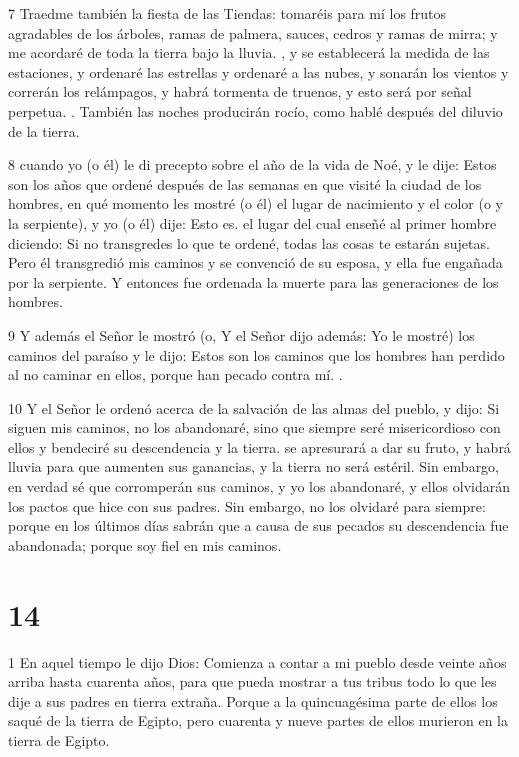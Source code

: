 \par 7 Traedme también la fiesta de las Tiendas: tomaréis para mí los frutos agradables de los árboles, ramas de palmera, sauces, cedros y ramas de mirra; y me acordaré de toda la tierra bajo la lluvia. , y se establecerá la medida de las estaciones, y ordenaré las estrellas y ordenaré a las nubes, y sonarán los vientos y correrán los relámpagos, y habrá tormenta de truenos, y esto será por señal perpetua. . También las noches producirán rocío, como hablé después del diluvio de la tierra.

\par 8 cuando yo (o él) le di precepto sobre el año de la vida de Noé, y le dije: Estos son los años que ordené después de las semanas en que visité la ciudad de los hombres, en qué momento les mostré (o él) el lugar de nacimiento y el color (o y la serpiente), y yo (o él) dije: Esto es. el lugar del cual enseñé al primer hombre diciendo: Si no transgredes lo que te ordené, todas las cosas te estarán sujetas. Pero él transgredió mis caminos y se convenció de su esposa, y ella fue engañada por la serpiente. Y entonces fue ordenada la muerte para las generaciones de los hombres.

\par 9 Y además el Señor le mostró (o, Y el Señor dijo además: Yo le mostré) los caminos del paraíso y le dijo: Estos son los caminos que los hombres han perdido al no caminar en ellos, porque han pecado contra mí. .

\par 10 Y el Señor le ordenó acerca de la salvación de las almas del pueblo, y dijo: Si siguen mis caminos, no los abandonaré, sino que siempre seré misericordioso con ellos y bendeciré su descendencia y la tierra. se apresurará a dar su fruto, y habrá lluvia para que aumenten sus ganancias, y la tierra no será estéril. Sin embargo, en verdad sé que corromperán sus caminos, y yo los abandonaré, y ellos olvidarán los pactos que hice con sus padres. Sin embargo, no los olvidaré para siempre: porque en los últimos días sabrán que a causa de sus pecados su descendencia fue abandonada; porque soy fiel en mis caminos.

\chapter{14}

\par 1 En aquel tiempo le dijo Dios: Comienza a contar a mi pueblo desde veinte años arriba hasta cuarenta años, para que pueda mostrar a tus tribus todo lo que les dije a sus padres en tierra extraña. Porque a la quincuagésima parte de ellos los saqué de la tierra de Egipto, pero cuarenta y nueve partes de ellos murieron en la tierra de Egipto.

